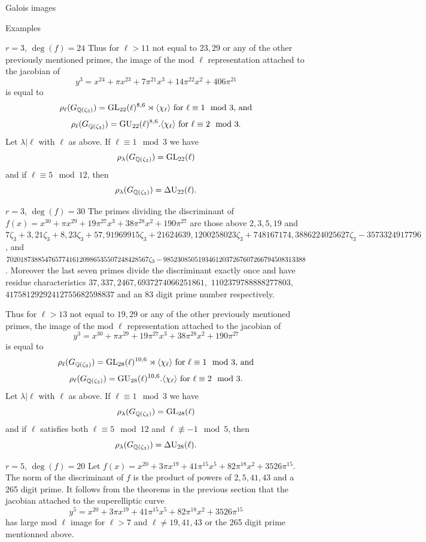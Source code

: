 \documentclass[11pt,a4paper]{article}
\newcommand{\Gcyclo}[1]{G_{\QQ(\zeta_{#1})}}
\begin{document}
\begin{section}{Galois images}
\begin{subsection}{Examples}
\begin{subsubsection}{$r=3$, $\deg(f) = 24$}
Thus for $\ell>11$ not equal to $23, 29$ or any of the other previously mentioned primes, the image of the mod $\ell$ representation attached to the jacobian of
\[y^3 = x^{24} + \pi x^{23} + 7\pi^{21} x^3 + 14\pi ^{22} x^2 + 406\pi^{21}
\]
is equal to 
\[\rho_\ell(\Gcyclo{3}) = \GL_{22}(\ell)^{8,6} \rtimes \langle \chi_\ell \rangle \text{ for $\ell \equiv 1 \mod{3}$, and}
\]
\[\rho_\ell(\Gcyclo{3}) = \GU_{22}(\ell)^{8,6} . \langle \chi_\ell \rangle \text{ for $\ell \equiv 2 \mod{3}$.}
\]
Let $\lambda|\ell$ with $\ell$ as above. If $\ell \equiv 1 \mod{3}$ we have \[\rho_\lambda(\Gcyclo{3})=\GL_{22}(\ell)\]
and if $\ell \equiv 5 \mod{12}$, then
\[\rho_\lambda(\Gcyclo{3})=\DU_{22}(\ell).\]
\end{subsubsection}
\begin{subsubsection}{$r=3$, $\deg(f) = 30$}
The primes dividing the discriminant of $f(x) = x^{30} + \pi x^{29} + 19\pi^{27} x^3 + 38\pi ^{28} x^2 + 190\pi^{27}$ are those above $2,3,5,19$ and $7\zeta_3 + 3,
21\zeta_3 + 8, 23\zeta_3 + 57, 91969915\zeta_3 + 21624639, 1200258023\zeta_3 +
748167174, 3886224025627\zeta_3 - 3573324917796$, and $70201873885476577416120986535507248428567\zeta_3\\  -
98523085051934612037267607266794508313388$.
Moreover the last seven primes divide the discriminant exactly once and have residue characteristics $37, 337, 2467, 6937274066251861,$ $1102379788888277803,$ $41758129292412755682598837$ and an 83 digit prime number respectively.

Thus for $\ell>13$ not equal to $19,29$ or any of the other previously mentioned primes, the image of the mod $\ell$ representation attached to the jacobian of
\[y^3 = x^{30} + \pi x^{29} + 19\pi^{27} x^3 + 38\pi ^{28} x^2 + 190\pi^{27}
\]
is equal to 
\[\rho_\ell(\Gcyclo{3}) = \GL_{28}(\ell)^{10,6} \rtimes \langle \chi_\ell \rangle \text{ for $\ell \equiv 1 \mod{3}$, and}
\]
\[\rho_\ell(\Gcyclo{3}) = \GU_{28}(\ell)^{10,6} . \langle \chi_\ell \rangle \text{ for $\ell \equiv 2 \mod{3}$.}
\]
Let $\lambda|\ell$ with $\ell$ as above. If $\ell \equiv 1 \mod{3}$ we have \[\rho_\lambda(\Gcyclo{3})=\GL_{28}(\ell)\]
and if $\ell$ satisfies both $\ell \equiv 5 \mod{12}$ and $\ell \not \equiv -1 \mod{5} $, then
\[\rho_\lambda(\Gcyclo{3})=\DU_{28}(\ell).\]
\end{subsubsection}

\begin{subsubsection}{$r=5$, $\deg(f) = 20$}
Let $f(x) = x^{20} + 3\pi x^{19} + 41\pi^{15}x^5 + 82\pi^{18}x^2 + 3526\pi^{15}$. The norm of the discriminant of $f$ is the product of powers of $2,5,41,43$ and a 265 digit prime. It follows from the theorems in the previous section that the jacobian attached to the superelliptic curve
\[ y^5 = x^{20} + 3\pi x^{19} + 41\pi^{15}x^5 + 82\pi^{18}x^2 + 3526\pi^{15}
\]
has large mod $\ell$ image for $\ell > 7$ and $\ell \neq 19,41,43$ or the 265 digit prime mentionned above.


\end{subsubsection}
\end{subsection}
\end{section}
\end{document}
